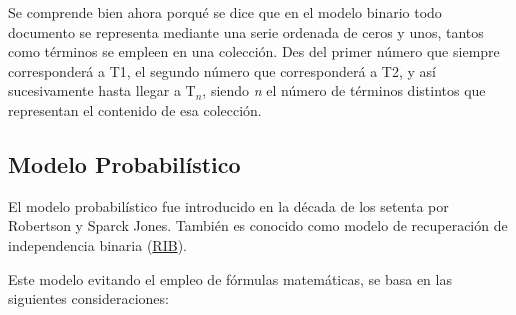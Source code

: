 \documentclass[titlepage]{article}
\begin{document}
Se comprende bien ahora porqué se dice que en el modelo binario todo documento se representa mediante una serie ordenada de ceros y unos, tantos como términos se empleen en una colección. Des del primer número que siempre corresponderá a T1, el segundo número que corresponderá a T2, y así sucesivamente hasta llegar a T$_{n}$, siendo \textit{n} el número de términos distintos que representan el contenido de esa colección.

\subsection{Modelo Probabilístico}

El modelo probabilístico fue introducido en la década de los setenta por Robertson y Sparck Jones. También es conocido como modelo de recuperación de independencia binaria (\href{https://es.wikipedia.org/wiki/Modelo_de_independencia_binaria}{RIB}). 

Este modelo evitando el empleo de fórmulas matemáticas, se basa en las siguientes consideraciones:
\end{document}
